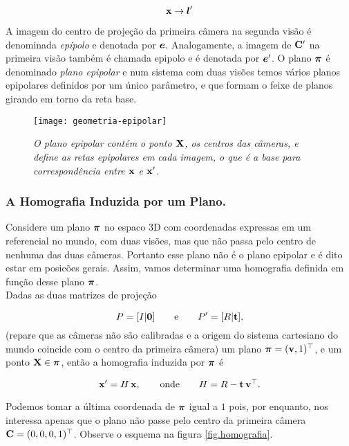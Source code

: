 \begin{equation*}
\mathbf{x}\rightarrow\boldsymbol{l}'
\end{equation*}

A imagem do centro de projeção da primeira câmera na segunda visão é denominada \textit{epipolo} e denotada por $\boldsymbol{e}$. Analogamente, a imagem de ${\bf C}'$ na primeira visão também é chamada epipolo e é denotada por $\boldsymbol{e}'$.
O plano $\boldsymbol{\pi}$ é denominado \textit{plano epipolar} e num sistema com duas visões temos vários planos epipolares definidos por um único parâmetro, e que formam o feixe de planos girando em torno da reta base.

\begin{figure}[!htb]
\centering
\texttt{[image: geometria-epipolar]}
\caption{\textit{O plano epipolar contém o ponto $\mathbf{X}$, os centros das câmeras, e define as retas epipolares em cada imagem, o que é a base para correspondência entre $\mathbf{x}$ e $\mathbf{x}'$.}}
\label{fig.geo-epipolar}
\end{figure}

\subsubsection{A Homografia Induzida por um Plano.}\label{sec.homografia}

Considere um plano $\boldsymbol{\pi}$ no espaco 3D com coordenadas expressas em um referencial no mundo, com duas visões, mas que não passa pelo centro de nenhuma das duas câmeras. Portanto esse plano não é o plano epipolar e é dito estar em posicões gerais. Assim, vamos determinar uma homografia definida em função desse plano $\boldsymbol{\pi}$.\\

Dadas as duas matrizes de projeção 

\begin{equation*}
P=[I|{\bf 0}]\qquad\text{e}\qquad P'=[R|{\bf t}],
\end{equation*}
(repare que as câmeras não são calibradas e a origem do sistema cartesiano do mundo coincide com o centro da primeira câmera) um plano $\boldsymbol{\pi}=({\bf v},1)^\top$, e um ponto $\mathbf{X}\in\boldsymbol{\pi}$, então a homografia induzida por $\boldsymbol{\pi}$ é

\begin{equation*}
\mathbf{x}'=H\,\mathbf{x},\qquad\text{onde}\qquad H=R-{\bf t}\,{\bf v}^\top.
\end{equation*}

Podemos tomar a última coordenada de $\boldsymbol{\pi}$ igual a $1$ pois, por enquanto, nos interessa apenas que o plano não passe pelo centro da primeira câmera ${\bf C}=(0,0,0,1)^\top$. Observe o esquema na figura \ref{fig.homografia}. 

